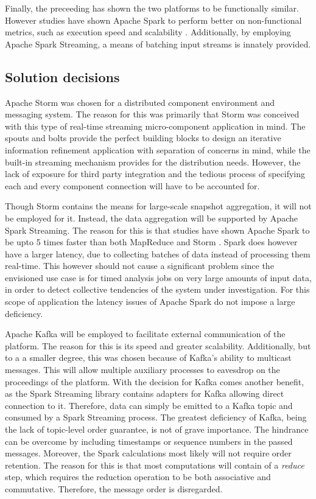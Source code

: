 Finally, the preceeding has shown the two platforms to be functionally similar. However studies have shown Apache Spark to perform better on non-functional metrics, such as execution speed and scalability \cite{mapreduce_vs_spark}. Additionally, by employing Apache Spark Streaming, a means of batching input streams is innately provided.


\subsection{Solution decisions}
\label{sec:solution_decision}
Apache Storm was chosen for a distributed component environment and messaging system. The reason for this was primarily that Storm was conceived with this type of real-time streaming micro-component application in mind. The spouts and bolts provide the perfect building blocks to design an iterative information refinement application with separation of concerns in mind, while the built-in streaming mechanism provides for the distribution needs. However, the lack of exposure for third party integration and the tedious process of specifying each and every component connection will have to be accounted for.

Though Storm contains the means for large-scale snapshot aggregation, it will not be employed for it. Instead, the data aggregation will be supported by Apache Spark Streaming. The reason for this is that studies have shown Apache Spark to be upto 5 times faster than both MapReduce \cite{mapreduce_vs_spark} and Storm \cite{spark_vs_storm}. Spark does however have a larger latency, due to collecting batches of data instead of processing them real-time. This however should not cause a significant problem since the envisioned use case is for timed analysis jobs on very large amounts of input data, in order to detect collective tendencies of the system under investigation. For this scope of application the latency issues of Apache Spark do not impose a large deficiency.

Apache Kafka will be employed to facilitate external communication of the platform. The reason for this is its speed and greater scalability. Additionally, but to a a smaller degree, this was chosen because of Kafka's ability to multicast messages. This will allow multiple auxiliary processes to eavesdrop on the proceedings of the platform. With the decision for Kafka comes another benefit, as the Spark Streaming library contains adapters for Kafka allowing direct connection to it. Therefore, data can simply be emitted to a Kafka topic and consumed by a Spark Streaming process. The greatest deficiency of Kafka, being the lack of topic-level order guarantee, is not of grave importance. The hindrance can be overcome by including timestamps or sequence numbers in the passed messages. Moreover, the Spark calculations most likely will not require order retention. The reason for this is that most computations will contain of a \emph{reduce} step, which requires the reduction operation to be both associative and commutative. Therefore, the message order is disregarded.

